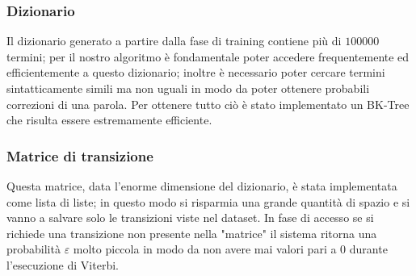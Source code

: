 \documentclass[a4paper,11pt]{article}
\begin{document}
        \subsubsection{Dizionario}
        	Il dizionario generato a partire dalla fase di training contiene più di $100000$ termini; per il nostro algoritmo è fondamentale
            poter accedere frequentemente ed efficientemente a questo dizionario; inoltre è necessario poter cercare termini sintatticamente simili ma non
            uguali in modo da poter ottenere probabili correzioni di una parola. Per ottenere tutto ciò è stato implementato un BK-Tree\cite{bktree} che risulta
            essere estremamente efficiente.
		\subsubsection{Matrice di transizione}
        	Questa matrice, data l'enorme dimensione del dizionario, è stata implementata come lista di liste; in questo modo si risparmia una grande
            quantità di spazio e si vanno a salvare solo le transizioni viste nel dataset. In fase di accesso se si richiede una transizione non
            presente nella "matrice" il sistema ritorna una probabilità $\varepsilon$ molto piccola in modo da non avere mai valori pari a 0 durante
            l'esecuzione di Viterbi.
\end{document}
